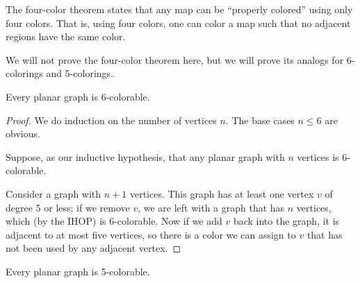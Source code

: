 \documentclass[../m55main.tex]{subfiles}
\begin{document}
The four-color theorem states that any map can be ``properly colored'' using only four colors.
That is, using four colors, one can color a map such that no adjacent regions have the same color.

We will not prove the four-color theorem here, but we will prove its analogs for 6-colorings and 5-colorings.

\begin{theorem}
    Every planar graph is 6-colorable.
\end{theorem}

\begin{proof}
    We do induction on the number of vertices $n$.
    The base cases $n \leq 6$ are obvious.

    Suppose, as our inductive hypothesis, that any planar graph with $n$ vertices is 6-colorable.

    Consider a graph with $n+1$ vertices.
    This graph has at least one vertex $v$ of degree 5 or less; if we remove $v$, we are left with a graph that has $n$ vertices, which (by the IHOP) is 6-colorable.
    Now if we add $v$ back into the graph, it is adjacent to at most five vertices, so there is a color we can assign to $v$ that has not been used by any adjacent vertex.
\end{proof}

\begin{theorem}
    Every planar graph is 5-colorable.
\end{theorem}
\end{document}

